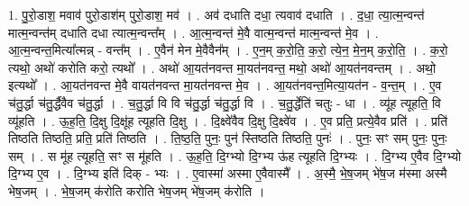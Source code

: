 \documentclass[17pt]{extarticle}
\begin{document}
1. पु॒रो॒डाश॒ मवाव॑ पुरो॒डाश॑म् पुरो॒डाश॒ मव॑ । . अव॑ दधाति दधा॒ त्यवाव॑ दधाति । . द॒धा॒ त्या॒त्म॒न्वन्त॑ मात्म॒न्वन्त॑म् दधाति दधा त्यात्म॒न्वन्त᳚म् । . आ॒त्म॒न्वन्त॑ मे॒वै वात्म॒न्वन्त॑ मात्म॒न्वन्त॑ मे॒व । . आ॒त्म॒न्वन्त॒मित्या᳚त्मन्न् - वन्त᳚म् । . ए॒वैन॑ मेन मे॒वैवैन᳚म् । . ए॒न॒म् क॒रो॒ति॒ क॒रो॒ त्ये॒न॒ मे॒न॒म् क॒रो॒ति॒ । . क॒रो॒ त्यथो॒ अथो॑ करोति करो॒ त्यथो᳚ । . अथो॑ आ॒यत॑नवन्त मा॒यत॑नवन्त॒ मथो॒ अथो॑ आ॒यत॑नवन्तम् । . अथो॒ इत्यथो᳚ । . आ॒यत॑नवन्त मे॒वै वायत॑नवन्त मा॒यत॑नवन्त मे॒व । . आ॒यत॑नवन्त॒मित्या॒यत॑न - व॒न्त॒म् । . ए॒व च॑तु॒र्द्धा च॑तु॒र्द्धैवैव च॑तु॒र्द्धा । . च॒तु॒र्द्धा वि वि च॑तु॒र्द्धा च॑तु॒र्द्धा वि । . च॒तु॒र्द्धेति॑ चतुः - धा । . व्यू॑ह त्यूहति॒ वि व्यू॑हति । . ऊ॒ह॒ति॒ दि॒क्षु दि॒क्षू॑ह त्यूहति दि॒क्षु । . दि॒क्ष्वे॑वैव दि॒क्षु दि॒क्ष्वे॑व । . ए॒व प्रति॒ प्रत्ये॒वैव प्रति॑ । . प्रति॑ तिष्ठति तिष्ठति॒ प्रति॒ प्रति॑ तिष्ठति । . ति॒ष्ठ॒ति॒ पुनः॒ पुन॑ स्तिष्ठति तिष्ठति॒ पुनः॑ । . पुनः॒ सꣳ सम् पुनः॒ पुनः॒ सम् । . स मू॑ह त्यूहति॒ सꣳ स मू॑हति । . ऊ॒ह॒ति॒ दि॒ग्भ्यो दि॒ग्भ्य ऊ॑ह त्यूहति दि॒ग्भ्यः । . दि॒ग्भ्य ए॒वैव दि॒ग्भ्यो दि॒ग्भ्य ए॒व । . दि॒ग्भ्य इति॑ दिक् - भ्यः । . ए॒वास्मा॑ अस्मा ए॒वैवास्मै᳚ । . अ॒स्मै॒ भे॒ष॒जम् भे॑ष॒ज म॑स्मा अस्मै भेष॒जम् । . भे॒ष॒जम् क॑रोति करोति भेष॒जम् भे॑ष॒जम् क॑रोति । \newline
\end{document}
